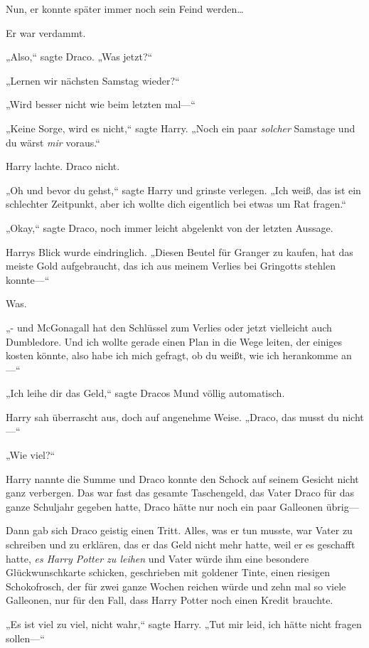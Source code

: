 {Nun, er konnte später immer noch sein Feind werden…

Er war verdammt.

„Also,“ sagte Draco. „Was jetzt?“

„Lernen wir nächsten Samstag wieder?“

„Wird besser nicht wie beim letzten mal—“

„Keine Sorge, wird es nicht,“ sagte Harry. „Noch ein paar \emph{solcher} Samstage und du wärst \emph{mir} voraus.“

Harry lachte. Draco nicht.

„Oh und bevor du gehst,“ sagte Harry und grinste verlegen. „Ich weiß, das ist ein schlechter Zeitpunkt, aber ich wollte dich eigentlich bei etwas um Rat fragen.“

„Okay,“ sagte Draco, noch immer leicht abgelenkt von der letzten Aussage.

Harrys Blick wurde eindringlich. „Diesen Beutel für Granger zu kaufen, hat das meiste Gold aufgebraucht, das ich aus meinem Verlies bei Gringotts stehlen konnte—“

Was.

„- und McGonagall hat den Schlüssel zum Verlies oder jetzt vielleicht auch Dumbledore. Und ich wollte gerade einen Plan in die Wege leiten, der einiges kosten könnte, also habe ich mich gefragt, ob du weißt, wie ich herankomme an—“

„Ich leihe dir das Geld,“ sagte Dracos Mund völlig automatisch.

Harry sah überrascht aus, doch auf angenehme Weise. „Draco, das musst du nicht—“

„Wie viel?“

Harry nannte die Summe und Draco konnte den Schock auf seinem Gesicht nicht ganz verbergen. Das war fast das gesamte Taschengeld, das Vater Draco für das ganze Schuljahr gegeben hatte, Draco hätte nur noch ein paar Galleonen übrig—

Dann gab sich Draco geistig einen Tritt. Alles, was er tun musste, war Vater zu schreiben und zu erklären, das er das Geld nicht mehr hatte, weil er es geschafft hatte, \emph{es Harry Potter zu leihen} und Vater würde ihm eine besondere Glückwunschkarte schicken, geschrieben mit goldener Tinte, einen riesigen Schokofrosch, der für zwei ganze Wochen reichen würde und zehn mal so viele Galleonen, nur für den Fall, dass Harry Potter noch einen Kredit brauchte.

„Es ist viel zu viel, nicht wahr,“ sagte Harry. „Tut mir leid, ich hätte nicht fragen sollen—“

}
